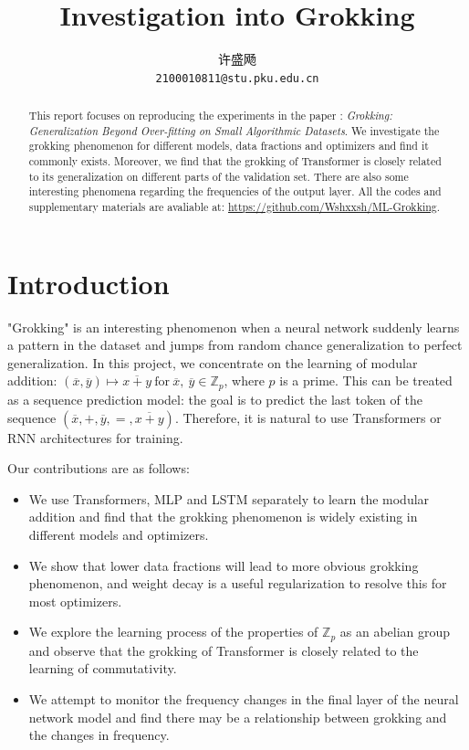 \documentclass{article}
\title{Investigation into Grokking}
\author{
  许盛飏\\
  \texttt{2100010811@stu.pku.edu.cn} \\
}
\begin{document}
\maketitle

\begin{abstract}
    This report focuses on reproducing the experiments in the paper \cite{power2022grokking}: \emph{Grokking: Generalization Beyond Over-fitting on Small Algorithmic Datasets}. We investigate the grokking phenomenon for different models, data fractions and optimizers and find it commonly exists. Moreover, we find that the grokking of Transformer is closely related to its generalization on different parts of the validation set. There are also some interesting phenomena regarding the frequencies of the output layer. All the codes and supplementary materials are avaliable at: \href{https://github.com/Wshxxsh/ML-Grokking}{https://github.com/Wshxxsh/ML-Grokking}.
\end{abstract}



\section{Introduction}


"Grokking" is an interesting phenomenon when a neural network suddenly learns a pattern in the dataset and jumps from random chance generalization to perfect generalization. In this project, we concentrate on the learning of modular addition: $(\overline{x}, \overline{y}) \mapsto \overline{x + y}\ \text{for}\  \overline{x},\ \overline{y} \in \mathbb{Z}_p$, where $p$ is a prime. This can be treated as a sequence prediction model: the goal is to predict the last token of the sequence $(\overline{x},+,\overline{y},=,\overline{x + y})$. Therefore, it is natural to use Transformers or RNN architectures for training.

Our contributions are as follows:
\begin{itemize}
    \item We use Transformers, MLP and LSTM separately to learn the modular addition and find that the grokking phenomenon is widely existing in different models and optimizers.

    \item We show that lower data fractions will lead to more obvious grokking phenomenon, and weight decay is a useful regularization to resolve this for most optimizers.

    \item We explore the learning process of the properties of $\mathbb{Z}_p$ as an abelian group and observe that the grokking of Transformer is closely related to the learning of commutativity.

    \item We attempt to monitor the frequency changes in the final layer of the neural network model and find there may be a relationship between grokking and the changes in frequency.
\end{itemize}
\end{document}

